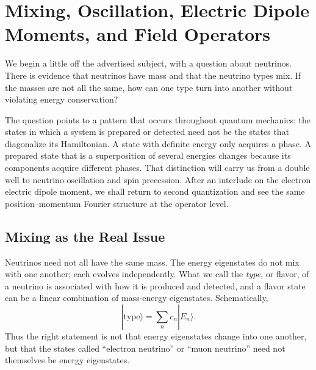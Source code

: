 \chapter{Mixing, Oscillation, Electric Dipole Moments, and Field Operators}

We begin a little off the advertised subject, with a question about neutrinos. There is evidence that neutrinos have mass and that the neutrino types mix. If the masses are not all the same, how can one type turn into another without violating energy conservation?

The question points to a pattern that occurs throughout quantum mechanics: the states in which a system is prepared or detected need not be the states that diagonalize its Hamiltonian. A state with definite energy only acquires a phase. A prepared state that is a superposition of several energies changes because its components acquire different phases. That distinction will carry us from a double well to neutrino oscillation and spin precession. After an interlude on the electron electric dipole moment, we shall return to second quantization and see the same position--momentum Fourier structure at the operator level.

\section{Mixing as the Real Issue}

Neutrinos need not all have the same mass. The energy eigenstates do not mix with one another; each evolves independently. What we call the \emph{type}, or flavor, of a neutrino is associated with how it is produced and detected, and a flavor state can be a linear combination of mass-energy eigenstates. Schematically,
\begin{equation}
|\text{type}\rangle = \sum_n c_n |E_n\rangle .
\end{equation}
Thus the right statement is not that energy eigenstates change into one another, but that the states called ``electron neutrino'' or ``muon neutrino'' need not themselves be energy eigenstates.

\begin{classroomqa}
\end{classroomqa}

